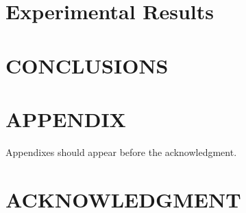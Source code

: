\documentclass[letterpaper, 10 pt, conference]{ieeeconf}  %
\begin{document}
\section{Experimental Results}







\section{CONCLUSIONS}


\addtolength{\textheight}{-12cm}   %







\section*{APPENDIX}

Appendixes should appear before the acknowledgment.

\section*{ACKNOWLEDGMENT}










\end{document}
